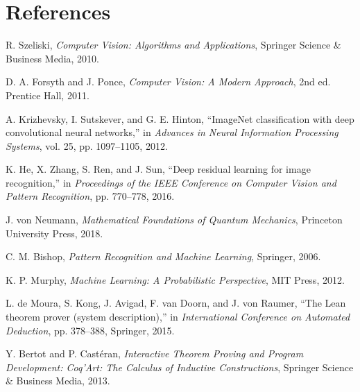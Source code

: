 \documentclass[11pt,a4paper]{article}
\begin{document}










\section{References}
\label{sec:references}

\begin{thebibliography}{99}

R. Szeliski, \textit{Computer Vision: Algorithms and Applications}, Springer Science \& Business Media, 2010.

D. A. Forsyth and J. Ponce, \textit{Computer Vision: A Modern Approach}, 2nd ed. Prentice Hall, 2011.

A. Krizhevsky, I. Sutskever, and G. E. Hinton, ``ImageNet classification with deep convolutional neural networks,'' in \textit{Advances in Neural Information Processing Systems}, vol. 25, pp. 1097--1105, 2012.

K. He, X. Zhang, S. Ren, and J. Sun, ``Deep residual learning for image recognition,'' in \textit{Proceedings of the IEEE Conference on Computer Vision and Pattern Recognition}, pp. 770--778, 2016.

J. von Neumann, \textit{Mathematical Foundations of Quantum Mechanics}, Princeton University Press, 2018.

C. M. Bishop, \textit{Pattern Recognition and Machine Learning}, Springer, 2006.

K. P. Murphy, \textit{Machine Learning: A Probabilistic Perspective}, MIT Press, 2012.

L. de Moura, S. Kong, J. Avigad, F. van Doorn, and J. von Raumer, ``The Lean theorem prover (system description),'' in \textit{International Conference on Automated Deduction}, pp. 378--388, Springer, 2015.

Y. Bertot and P. Castéran, \textit{Interactive Theorem Proving and Program Development: Coq'Art: The Calculus of Inductive Constructions}, Springer Science \& Business Media, 2013.


\end{thebibliography}
\end{document}
